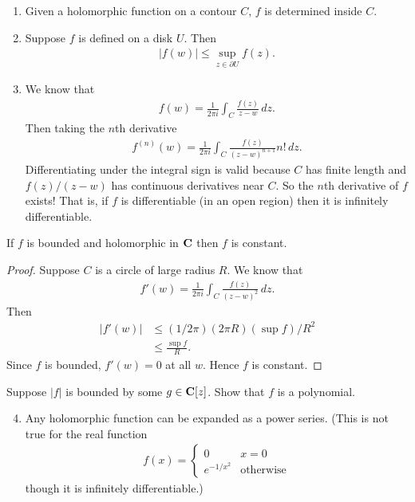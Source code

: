 \documentclass[11pt, oneside,margin=1in]{article}
\begin{document}
\begin{enumerate}
	\item Given a holomorphic function on a contour $C$, $f$ is determined inside $C$.
	\item Suppose $f$ is defined on a disk $U$. Then 
		\begin{align*}
			\left\lvert f(w) \right\rvert \le\sup_{z\in \partial U} f(z).
		\end{align*}
	\item We know that
		\begin{align*}
			f(w) =  \frac{1}{2\pi i} \int_{C}^{} \frac{f(z)}{z-w}  \, dz. 
		\end{align*}
		Then taking the $n$th derivative 
		\begin{align*}
			f^{ (n)}  (w) =  \frac{1}{2\pi i} \int_{C}^{} \frac{f(z)}{(z-w)^{n+1}} n! \, dz. 
		\end{align*}
		Differentiating under the integral sign is valid because $C$ has finite length and $f(z)/ (z-w)$ has continuous derivatives near $C$. So the $n$th derivative of $f$ exists! That is, if $f$ is differentiable (in an open region) then it is infinitely differentiable.
\end{enumerate}
\begin{theorem}[Liouville]\label{lvl}\index{}\text{}
If $f$ is bounded and holomorphic in $\mathbf C$ then $f$ is constant.
\end{theorem}
\begin{proof}
Suppose $C$ is a circle of large radius $R$. We know that
\begin{align*}
	f'(w) =  \frac{1}{2\pi i}\int_{C}^{} \frac{f(z)}{(z-w)^2}  \, dz. 
\end{align*}
Then 
\begin{align*}
	\left\lvert f'(w) \right\rvert &\le (1/2\pi)  (2\pi R)  (\sup f)/R^2 \\
				       &\le \frac{\sup f}{R}.
\end{align*}
Since $f$ is bounded, $f'(w)=0$ at all $w$. Hence $f$ is constant.
\end{proof}

\begin{exercise}\label{}\text{}
Suppose $\left\lvert f \right\rvert$ is bounded by some $g\in \mathbf C[z]$. Show that $f$ is a polynomial.
\end{exercise}
\begin{enumerate}
	\setcounter{enumi}{3}
	\item Any holomorphic function can be expanded as a power series. (This is not true for the real function
		\begin{align*}
			f(x) = 
			 \begin{cases}
				 0  & x=0\\
				 e^{-1/x^2} &\textrm{otherwise}
			\end{cases}
		\end{align*}
		though it is infinitely differentiable.)
\end{enumerate}
\end{document}
